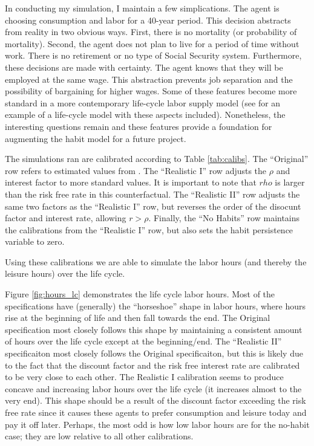 \documentclass[ProjectMMD]{subfiles}
\begin{document}
In conducting my simulation, I maintain a few simplications. The agent is choosing consumption and labor for a 40-year period. This decision abstracts from reality in two obvious ways. First, there is no mortality (or probability of mortality). Second, the agent does not plan to live for a period of time without work. There is no retirement or no type of Social Security system. Furthermore, these decisions are made with certainty. The agent knows that they will be employed at the same wage. This abstraction prevents job separation and the possibility of bargaining for higher wages. Some of these features become more standard in a more contemporary life-cycle labor supply model (see \cite{keane2016labour} for an example of a life-cycle model with these aspects included). Nonetheless, the interesting questions remain and these features provide a foundation for augmenting the habit model for a future project. 

The simulations ran are calibrated according to Table \ref{tab:calibs}. The ``Original'' row refers to estimated values from \cite{bover1991relaxing}. The ``Realistic I'' row adjusts the $\rho$ and interest factor to more standard values. It is important to note that $rho$ is larger than the risk free rate in this counterfactual.  The ``Realistic II'' row adjusts the same two factors as the ``Realistic I'' row, but reverses the order of the disocunt factor and interest rate, allowing $r > \rho$. Finally, the ``No Habits'' row maintains the calibrations from the ``Realistic I'' row, but also sets the habit persistence variable to zero.

Using these calibrations we are able to simulate the labor hours (and thereby the leisure hours) over the life cycle.
\renewcommand{\figName}{hours_lc}
\renewcommand{\figFile}{\figName}
\hypertarget{\figFile}{}


Figure \ref{fig:hours_lc} demonstrates the life cycle labor hours. Most of the specifications have (generally) the ``horseshoe'' shape in labor hours, where hours rise at the beginning of life and then fall towards the end. The Original specification most closely follows this shape by maintaining a consistent amount of hours over the life cycle except at the beginning/end. The ``Realistic II'' specificaiton most closely follows the Original specificaiton, but this is likely due to the fact that the discount factor and the risk free interest rate are calibrated to be very close to each other. The Realistic I calibration seems to produce concave and increasing labor hours over the life cycle (it increases almost to the very end). This shape should be a result of the discount factor exceeding the risk free rate since it causes these agents to prefer consumption and leisure today and pay it off later. Perhaps, the most odd is how low labor hours are for the no-habit case; they are low relative to all other calibrations. 
\end{document}
